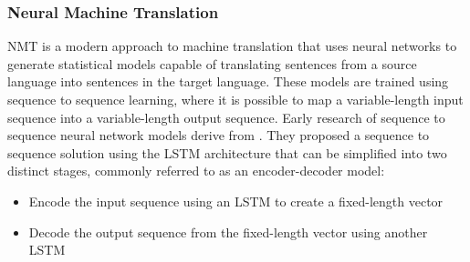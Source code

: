 


\subsubsection{Neural Machine Translation}

\acrfull{NMT} is a modern approach to machine translation that uses neural networks to generate statistical models capable of translating sentences from a source language into sentences in the target language.
These models are trained using sequence to sequence learning, where it is possible to map a variable-length input sequence into a variable-length output sequence. %
Early research of sequence to sequence neural network models derive from \cite{sutskever_sequence_2014}. They proposed a sequence to sequence solution using the \acrshort{LSTM} architecture that can be simplified into two distinct stages, commonly referred to as an encoder-decoder model:
\begin{itemize}
    \item Encode the input sequence using an \acrshort{LSTM} to create a fixed-length vector
    \item Decode the output sequence from the fixed-length vector using another \acrshort{LSTM}
\end{itemize}

